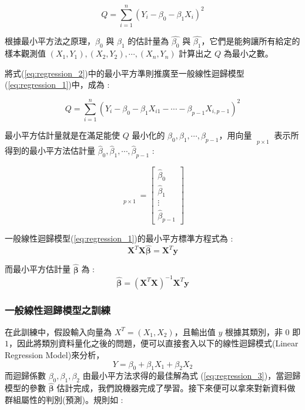 \begin{equation}\label{eq:regression_2}
Q = \sum_{i = 1}^n (Y_i - \beta_0 - \beta_1 X_i)^2
\end{equation}

根據最小平方法之原理，$\beta_0$ 與 $\beta_1$ 的估計量為 $\hat{\beta_0}$ 與 $\hat{\beta_1}$，它們是能夠讓所有給定的樣本觀測值 $(X_1, Y_1), (X_2, Y_2), \cdots ,(X_n, Y_n)$ 計算出之 $Q$ 為最小之數。

將式(\ref{eq:regression_2})中的最小平方準則推廣至一般線性迴歸模型(\ref{eq:regression_1})中，成為 :

\[Q = \sum_{i = 1}^{n} (Y_i - \beta_0 - \beta_1 X_{i1} - \cdots - \beta_{p-1} X_{i, p-1})^2\]

最小平方估計量就是在滿足能使 $Q$ 最小化的 $\beta_0, \beta_1, \cdots, \beta_{p-1}$，用向量 $\mathop{\boldsymbol{\hat{\beta}}} \limits_{p \times 1}$ 表示所得到的最小平方法估計量 $\hat{\beta}_0, \hat{\beta}_1, \cdots, \hat{\beta}_{p-1}$ :

\[\mathop{\boldsymbol{\hat{\beta}}} \limits_{p \times 1} = \begin{bmatrix}
\hat{\beta}_0\\
\hat{\beta}_1\\
\vdots \\
\hat{\beta}_{p-1}
\end{bmatrix}\]

一般線性迴歸模型(\ref{eq:regression_1})的最小平方標準方程式為 :
\[\mathbf{X}^T \mathbf{X} \boldsymbol{\hat{\beta}} = \mathbf{X}^T \mathbf{y}\]

而最小平方估計量 $\boldsymbol{\hat{\beta}}$ 為 :
\begin{equation}\label{eq:regression_3}
\boldsymbol{\hat{\beta}} = (\mathbf{X}^T \mathbf{X})^{-1} \mathbf{X}^T \mathbf{y}
\end{equation}
\subsubsection{一般線性迴歸模型之訓練}
在此訓練中，假設輸入向量為 $X^T = (X_1, X_2)$，且輸出值 $y$ 根據其類別，非 $0$ 即 $1$，因此將類別資料量化之後的問題，便可以直接套入以下的線性迴歸模式(Linear Regression Model)來分析，
\begin{equation}\label{eq:regression_4}
Y = \beta_0 + \beta_1 X_{1} + \beta_2 X_{2}
\end{equation}
而迴歸係數 $\beta_0, \beta_1, \beta_2$ 由最小平方法求得的最佳解為式 (\ref{eq:regression_3})，當迴歸模型的參數 $\boldsymbol{\hat{\beta}}$ 估計完成，我們說機器完成了學習。接下來便可以拿來對新資料做群組屬性的判別(預測)。規則如 :

